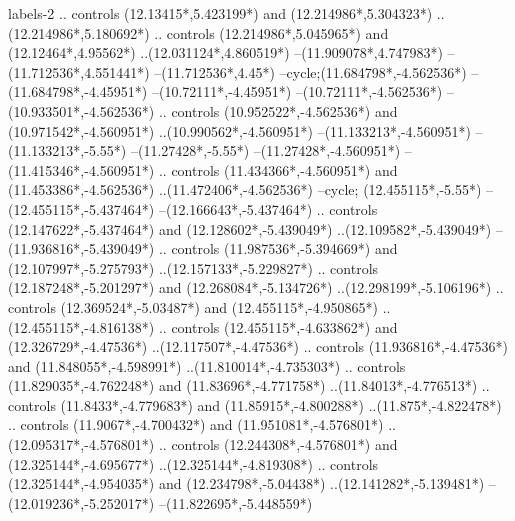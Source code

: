 {\begin{scope}[x=1mm,y=1mm,line width=\SCstroke mm,line cap=round,line join=round]
\begin{SCpart}{labels-2}
.. controls ({12.13415*\SCF},{5.423199*\SCF}) and ({12.214986*\SCF},{5.304323*\SCF}) ..({12.214986*\SCF},{5.180692*\SCF})
.. controls ({12.214986*\SCF},{5.045965*\SCF}) and ({12.12464*\SCF},{4.95562*\SCF}) ..({12.031124*\SCF},{4.860519*\SCF})
--({11.909078*\SCF},{4.747983*\SCF})
--({11.712536*\SCF},{4.551441*\SCF})
--({11.712536*\SCF},{4.45*\SCF})
--cycle; ({11.684798*\SCF},{-4.562536*\SCF})
--({11.684798*\SCF},{-4.45951*\SCF})
--({10.72111*\SCF},{-4.45951*\SCF})
--({10.72111*\SCF},{-4.562536*\SCF})
--({10.933501*\SCF},{-4.562536*\SCF})
.. controls ({10.952522*\SCF},{-4.562536*\SCF}) and ({10.971542*\SCF},{-4.560951*\SCF}) ..({10.990562*\SCF},{-4.560951*\SCF})
--({11.133213*\SCF},{-4.560951*\SCF})
--({11.133213*\SCF},{-5.55*\SCF})
--({11.27428*\SCF},{-5.55*\SCF})
--({11.27428*\SCF},{-4.560951*\SCF})
--({11.415346*\SCF},{-4.560951*\SCF})
.. controls ({11.434366*\SCF},{-4.560951*\SCF}) and ({11.453386*\SCF},{-4.562536*\SCF}) ..({11.472406*\SCF},{-4.562536*\SCF})
--cycle;
 ({12.455115*\SCF},{-5.55*\SCF})
--({12.455115*\SCF},{-5.437464*\SCF})
--({12.166643*\SCF},{-5.437464*\SCF})
.. controls ({12.147622*\SCF},{-5.437464*\SCF}) and ({12.128602*\SCF},{-5.439049*\SCF}) ..({12.109582*\SCF},{-5.439049*\SCF})
--({11.936816*\SCF},{-5.439049*\SCF})
.. controls ({11.987536*\SCF},{-5.394669*\SCF}) and ({12.107997*\SCF},{-5.275793*\SCF}) ..({12.157133*\SCF},{-5.229827*\SCF})
.. controls ({12.187248*\SCF},{-5.201297*\SCF}) and ({12.268084*\SCF},{-5.134726*\SCF}) ..({12.298199*\SCF},{-5.106196*\SCF})
.. controls ({12.369524*\SCF},{-5.03487*\SCF}) and ({12.455115*\SCF},{-4.950865*\SCF}) ..({12.455115*\SCF},{-4.816138*\SCF})
.. controls ({12.455115*\SCF},{-4.633862*\SCF}) and ({12.326729*\SCF},{-4.47536*\SCF}) ..({12.117507*\SCF},{-4.47536*\SCF})
.. controls ({11.936816*\SCF},{-4.47536*\SCF}) and ({11.848055*\SCF},{-4.598991*\SCF}) ..({11.810014*\SCF},{-4.735303*\SCF})
.. controls ({11.829035*\SCF},{-4.762248*\SCF}) and ({11.83696*\SCF},{-4.771758*\SCF}) ..({11.84013*\SCF},{-4.776513*\SCF})
.. controls ({11.8433*\SCF},{-4.779683*\SCF}) and ({11.85915*\SCF},{-4.800288*\SCF}) ..({11.875*\SCF},{-4.822478*\SCF})
.. controls ({11.9067*\SCF},{-4.700432*\SCF}) and ({11.951081*\SCF},{-4.576801*\SCF}) ..({12.095317*\SCF},{-4.576801*\SCF})
.. controls ({12.244308*\SCF},{-4.576801*\SCF}) and ({12.325144*\SCF},{-4.695677*\SCF}) ..({12.325144*\SCF},{-4.819308*\SCF})
.. controls ({12.325144*\SCF},{-4.954035*\SCF}) and ({12.234798*\SCF},{-5.04438*\SCF}) ..({12.141282*\SCF},{-5.139481*\SCF})
--({12.019236*\SCF},{-5.252017*\SCF})
--({11.822695*\SCF},{-5.448559*\SCF})

\end{SCpart}
\end{scope}}
